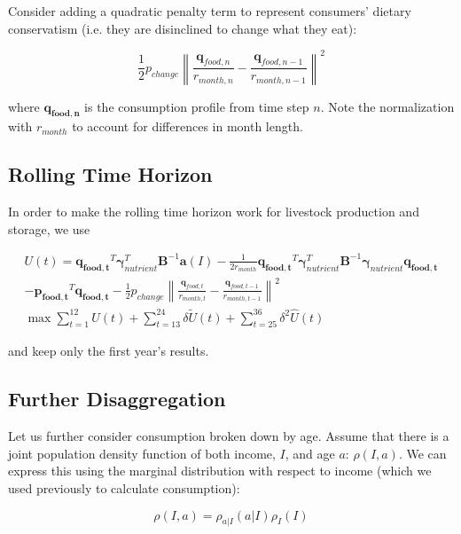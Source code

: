 \documentclass[letter,12pt]{article}
\begin{document}
Consider adding a quadratic penalty term to represent consumers' dietary conservatism (i.e. they are disinclined to change what they eat):

\begin{equation}
\frac{1}{2} p_{change} \left\|\frac{\mathbf{q}_{food,n}}{r_{month,n}} - \frac{\mathbf{q}_{food,n-1}}{r_{month,n-1}}\right\|^2
\end{equation}

\noindent where $\mathbf{q_{food,n}}$ is the consumption profile from time step $n$.  Note the normalization with $r_{month}$ to account for differences in month length.

\subsection{Rolling Time Horizon}

In order to make the rolling time horizon work for livestock production and storage, we use

\begin{gather}
U \left(t\right) = \mathbf{q_{food,t}}^T \boldsymbol \gamma_{nutrient}^T \mathbf{B}^{-1} \mathbf{a} \left(I\right) - \frac{1}{2r_{month}} \mathbf{q_{food,t}}^T \boldsymbol \gamma_{nutrient}^T \mathbf{B}^{-1} \boldsymbol \gamma_{nutrient} \mathbf{q_{food,t}} \nonumber \\ 
- \mathbf{p_{food,t}}^T \mathbf{q_{food,t}} - \frac{1}{2} p_{change} \left\|\frac{\mathbf{q}_{food,t}}{r_{month,t}} - \frac{\mathbf{q}_{food,t-1}}{r_{month,t-1}}\right\|^2 \\
\max \sum_{t=1}^{12} U\left(t\right) + \sum_{t=13}^{24} \delta \tilde{U}\left(t\right) + \sum_{t=25}^{36} \delta^2 \hat{U}\left(t\right)
\end{gather}

\noindent and keep only the first year's results.

\subsection{Further Disaggregation}

Let us further consider consumption broken down by age.  Assume that there is a joint population density function of both income, $I$, and age $a$: $\rho \left(I,a\right)$.  We can express this using the marginal distribution with respect to income (which we used previously to calculate consumption):

\begin{equation}
\rho \left(I,a\right) = \rho_{a|I} \left(a|I\right) \rho_I \left(I\right)
\end{equation}
\end{document}
